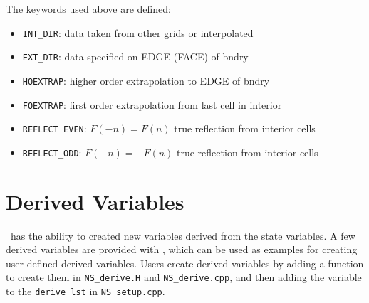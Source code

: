 The keywords used above are defined:
\begin{itemize}
\item {\tt INT\_DIR}: data taken from other grids or interpolated

\item {\tt EXT\_DIR}: data specified on EDGE (FACE) of bndry

\item {\tt HOEXTRAP}: higher order extrapolation to EDGE of bndry

\item {\tt FOEXTRAP}: first order extrapolation from last cell in interior

\item {\tt REFLECT\_EVEN}: $F(-n) = F(n)$ true reflection from interior cells

\item {\tt REFLECT\_ODD}: $F(-n) = -F(n)$ true reflection from interior cells
\end{itemize}







\section{Derived Variables}
\label{sec:derivedVariables}

\iamr\ has the ability to created new variables derived from the state variables.
A few derived variables are provided with \iamr, which can be used as examples for
creating user defined derived variables.
Users create derived variables by adding a function to create them in
{\tt NS\_derive.H} and {\tt NS\_derive.cpp}, and then adding the variable to the
{\tt derive\_lst} in {\tt NS\_setup.cpp}.

